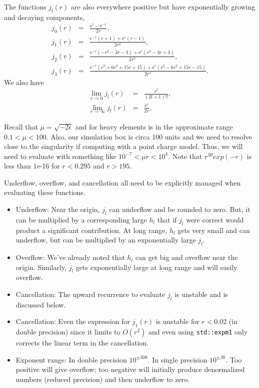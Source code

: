 \documentclass[12pt]{article}
\begin{document}
The functions $j_l(r)$ are also everywhere positive but have exponentially growing and decaying components,
\begin{eqnarray}
  j_0(r) & = & \frac{{\mathrm e}^{r}-{\mathrm e}^{-r}}{2 r} ,\\
  j_1(r) & = & \frac{{\mathrm e}^{-r}\left(r +1\right) +{\mathrm e}^{r} \left(r -1\right)}{2 r^{2}} , \\
  j_2(r) & = & \frac{{\mathrm e}^{-r}\left(-r^{2}-3 r -3\right)+{\mathrm e}^{r} \left(r^{2}-3 r +3\right)}{2 r^{3}} , \\
  j_3(r) & = & \frac{{\mathrm e}^{-r}\left(r^{3}+6 r^{2}+15 r +15\right)+{\mathrm e}^{r} \left(r^{3}-6 r^{2}+15 r -15\right)}{2 r^{4}} .
\end{eqnarray}
We also have
\begin{eqnarray}
  \lim_{r \rightarrow 0} j_l(r) & = & \frac{r^l}{(2l+1)!!} , \\
  \lim_{r \rightarrow \infty} j_l(r) & = & \frac{{\mathrm e}^{r}}{2r} .
\end{eqnarray}

Recall that $\mu = \sqrt{-2 \epsilon}$ and for heavy elements is in the approximate range $0.1<\mu<100$.  Also, our simulation box is circa 100 units and we need to resolve close to the singularity if computing with a point charge model.  Thus, we will need to evaluate with something like $10^{-7} < \mu r < 10^4$.  Note that $r^{30}exp(-r)$ is less than 1e-16 for $r<0.295$ and $r>195$.

Underflow, overflow, and cancellation all need to be explicitly managed when evaluating these functions.
\begin{itemize}
\item  Underflow: Near the origin, $j_l$ can underflow and be rounded to zero.  But, it can be multiplied by a corresponding large $h_l$ that if $j_l$ were correct would product a significant contribution.  At long range, $h_l$ gets very small and can underflow, but can be multiplied by an exponentially large $j_l$.
\item Overflow: We've already noted that $h_l$ can get big and overflow near the origin.  Similarly, $j_l$ gets exponentially large at long range and will easily overflow.
\item Cancellation: The upward recurrence to evaluate $j_l$ is unstable and is discussed below.
\item Cancellation: Even the expression for $j_1(r)$ is unstable for $r<0.02$ (in double precision) since it limits to $O(r^2)$ and even using \verb+std::expm1+ only corrects the linear term in the cancellation.
\item Exponent range: In double precision $10^{\pm 308}$.  In single precision $10^{\pm 38}$.  Too positive will give overflow; too negative will initially produce denormalized numbers (reduced precision) and then underflow to zero.
\end{itemize}
\end{document}
